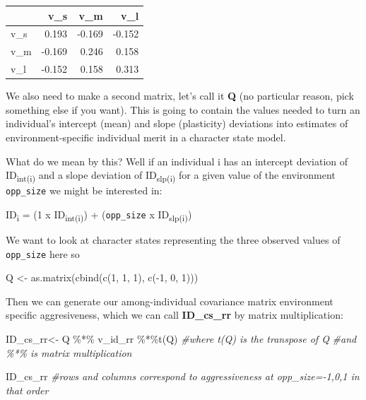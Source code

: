 \documentclass[
  12pt,
]{book}
\newenvironment{Shaded}{\begin{snugshade}}{\end{snugshade}}
\newcommand{\CommentTok}[1]{\textcolor[rgb]{0.56,0.35,0.01}{\textit{#1}}}
\newcommand{\DecValTok}[1]{\textcolor[rgb]{0.00,0.00,0.81}{#1}}
\newcommand{\FunctionTok}[1]{\textcolor[rgb]{0.00,0.00,0.00}{#1}}
\newcommand{\NormalTok}[1]{#1}
\newcommand{\OtherTok}[1]{\textcolor[rgb]{0.56,0.35,0.01}{#1}}
\newcommand{\SpecialCharTok}[1]{\textcolor[rgb]{0.00,0.00,0.00}{#1}}
\begin{document}
\begin{tabular}{l|r|r|r}
\hline
  & v\_s & v\_m & v\_l\\
\hline
v\_s & 0.193 & -0.169 & -0.152\\
\hline
v\_m & -0.169 & 0.246 & 0.158\\
\hline
v\_l & -0.152 & 0.158 & 0.313\\
\hline
\end{tabular}

We also need to make a second matrix, let's call it \textbf{Q} (no particular reason, pick something else if you want). This is going to contain the values needed to turn an individual's intercept (mean) and slope (plasticity) deviations into estimates of environment-specific individual merit in a character state model.

What do we mean by this? Well if an individual i has an intercept deviation of ID\textsubscript{int(i)} and a slope deviation of ID\textsubscript{slp(i)} for a given value of the environment \texttt{opp\_size} we might be interested in:

ID\textsubscript{i} = (1 x ID\textsubscript{int(i)}) + (\texttt{opp\_size} x ID\textsubscript{slp(i)})

We want to look at character states representing the three observed values of \texttt{opp\_size} here so

\begin{Shaded}
\begin{Highlighting}[]
\NormalTok{Q }\OtherTok{\textless{}{-}} \FunctionTok{as.matrix}\NormalTok{(}\FunctionTok{cbind}\NormalTok{(}\FunctionTok{c}\NormalTok{(}\DecValTok{1}\NormalTok{, }\DecValTok{1}\NormalTok{, }\DecValTok{1}\NormalTok{),}
                    \FunctionTok{c}\NormalTok{(}\SpecialCharTok{{-}}\DecValTok{1}\NormalTok{, }\DecValTok{0}\NormalTok{, }\DecValTok{1}\NormalTok{)))}
\end{Highlighting}
\end{Shaded}

Then we can generate our among-individual covariance matrix environment specific aggresiveness, which we can call \textbf{ID\_cs\_rr} by matrix multiplication:

\begin{Shaded}
\begin{Highlighting}[]
\NormalTok{ID\_cs\_rr}\OtherTok{\textless{}{-}}\NormalTok{ Q }\SpecialCharTok{\%*\%}\NormalTok{ v\_id\_rr }\SpecialCharTok{\%*\%}\FunctionTok{t}\NormalTok{(Q)    }\CommentTok{\#where t(Q) is the transpose of Q}
                               \CommentTok{\#and \%*\% is matrix multiplication}

\NormalTok{ID\_cs\_rr  }\CommentTok{\#rows and columns correspond to aggressiveness at opp\_size={-}1,0,1 in that order}
\end{Highlighting}
\end{Shaded}
\end{document}
